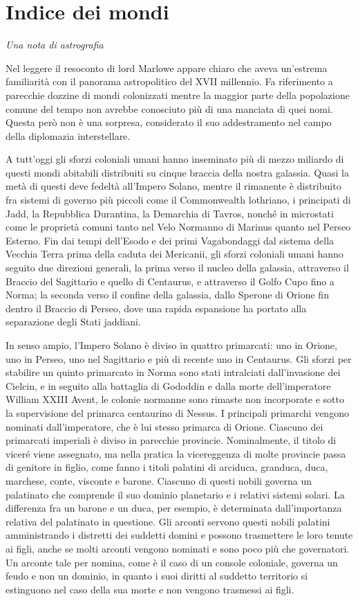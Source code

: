\chapter{Indice dei mondi}

\emph{Una nota di astrografia}

Nel leggere il resoconto di lord Marlowe appare chiaro che aveva
un'estrema familiarità con il panorama astropolitico del XVII millennio.
Fa riferimento a parecchie dozzine di mondi colonizzati mentre la
maggior parte della popolazione comune del tempo non avrebbe conosciuto
più di una manciata di quei nomi. Questa però non è una sorpresa,
considerato il suo addestramento nel campo della diplomazia
interstellare.

A tutt'oggi gli sforzi coloniali umani hanno inseminato più di mezzo
miliardo di questi mondi abitabili distribuiti su cinque braccia della
nostra galassia. Quasi la metà di questi deve fedeltà all'Impero Solano,
mentre il rimanente è distribuito fra sistemi di governo più piccoli
come il Commonwealth lothriano, i principati di Jadd, la Repubblica
Durantina, la Demarchia di Tavros, nonché in microstati come le
proprietà comuni tanto nel Velo Normanno di Marinus quanto nel Perseo
Esterno. Fin dai tempi dell'Esodo e dei primi Vagabondaggi dal sistema
della Vecchia Terra prima della caduta dei Mericanii, gli sforzi
coloniali umani hanno seguito due direzioni generali, la prima verso il
nucleo della galassia, attraverso il Braccio del Sagittario e quello di
Centaurus, e attraverso il Golfo Cupo fino a Norma; la seconda verso il
confine della galassia, dallo Sperone di Orione fin dentro il Braccio di
Perseo, dove una rapida espansione ha portato alla separazione degli
Stati jaddiani.

In senso ampio, l'Impero Solano è diviso in quattro primarcati: uno in
Orione, uno in Perseo, uno nel Sagittario e più di recente uno in
Centaurus. Gli sforzi per stabilire un quinto primarcato in Norma sono
stati intralciati dall'invasione dei Cielcin, e in seguito alla
battaglia di Gododdin e dalla morte dell'imperatore William XXIII Avent,
le colonie normanne sono rimaste non incorporate e sotto la supervisione
del primarca centaurino di Nessus. I principali primarchi vengono
nominati dall'imperatore, che è lui stesso primarca di Orione. Ciascuno
dei primarcati imperiali è diviso in parecchie provincie. Nominalmente,
il titolo di viceré viene assegnato, ma nella pratica la vicereggenza di
molte provincie passa di genitore in figlio, come fanno i titoli
palatini di arciduca, granduca, duca, marchese, conte, visconte e
barone. Ciascuno di questi nobili governa un palatinato che comprende il
suo dominio planetario e i relativi sistemi solari. La differenza fra un
barone e un duca, per esempio, è determinata dall'importanza relativa
del palatinato in questione. Gli arconti servono questi nobili palatini
amministrando i distretti dei suddetti domini e possono trasmettere le
loro tenute ai figli, anche se molti arconti vengono nominati e sono
poco più che governatori. Un arconte tale per nomina, come è il caso di
un console coloniale, governa un feudo e non un dominio, in quanto i
suoi diritti al suddetto territorio si estinguono nel caso della sua
morte e non vengono trasmessi ai figli.

